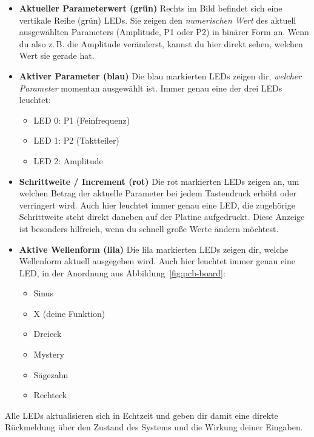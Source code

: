 \begin{itemize}
    \item \textbf{Aktueller Parameterwert (grün)}  
    Rechts im Bild befindet sich eine vertikale Reihe (grün) LEDs.  
    Sie zeigen den \emph{numerischen Wert} des aktuell ausgewählten Parameters
    (Amplitude, P1 oder P2) in binärer Form an.  
    Wenn du also z.\,B. die Amplitude veränderst, kannst du hier direkt sehen,
    welchen Wert sie gerade hat.

    \item \textbf{Aktiver Parameter (blau)}  
    Die blau markierten LEDs zeigen dir, \emph{welcher Parameter} momentan
    ausgewählt ist. Immer genau eine der drei LEDs leuchtet:
    \begin{itemize}
        \item LED 0: P1 (Feinfrequenz)
        \item LED 1: P2 (Taktteiler)
        \item LED 2: Amplitude
    \end{itemize}

    \item \textbf{Schrittweite / Increment (rot)}
    Die rot markierten LEDs zeigen an, um welchen Betrag der aktuelle Parameter
    bei jedem Tastendruck erhöht oder verringert wird. Auch hier leuchtet immer
    genau eine LED, die zugehörige Schrittweite steht direkt daneben auf der
    Platine aufgedruckt.
    Diese Anzeige ist besonders hilfreich, wenn du schnell große Werte ändern
    möchtest.

    \item \textbf{Aktive Wellenform (lila)}  
    Die lila markierten LEDs zeigen dir, welche Wellenform aktuell ausgegeben
    wird. Auch hier leuchtet immer genau eine LED, in der Anordnung aus
    Abbildung~\ref{fig:pcb-board}:
    \begin{itemize}
        \item Sinus
        \item X (deine Funktion)
        \item Dreieck
        \item Mystery
        \item Sägezahn
        \item Rechteck
    \end{itemize}
\end{itemize}

Alle LEDs aktualisieren sich in Echtzeit und geben dir damit eine direkte
Rückmeldung über den Zustand des Systems und die Wirkung deiner Eingaben.


